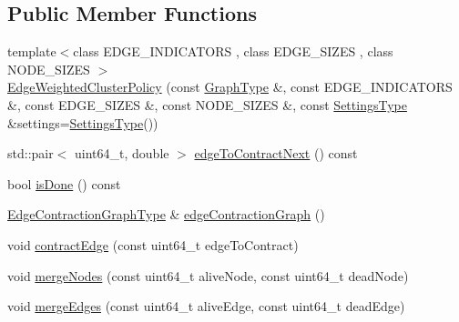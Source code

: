 \subsection*{Public Member Functions}
\begin{DoxyCompactItemize}
\item 
{\footnotesize template$<$class E\+D\+G\+E\+\_\+\+I\+N\+D\+I\+C\+A\+T\+O\+RS , class E\+D\+G\+E\+\_\+\+S\+I\+Z\+ES , class N\+O\+D\+E\+\_\+\+S\+I\+Z\+ES $>$ }\\\hyperlink{classnifty_1_1graph_1_1agglo_1_1EdgeWeightedClusterPolicy_a028e533bd1a4eca1b6fdebb70b50b899}{Edge\+Weighted\+Cluster\+Policy} (const \hyperlink{classnifty_1_1graph_1_1agglo_1_1EdgeWeightedClusterPolicy_a8e910f7b9d0c1baa1de7b6b1c3e58397}{Graph\+Type} \&, const E\+D\+G\+E\+\_\+\+I\+N\+D\+I\+C\+A\+T\+O\+RS \&, const E\+D\+G\+E\+\_\+\+S\+I\+Z\+ES \&, const N\+O\+D\+E\+\_\+\+S\+I\+Z\+ES \&, const \hyperlink{classnifty_1_1graph_1_1agglo_1_1EdgeWeightedClusterPolicy_a6c9e2acec086a9fcc4391f067a4ded46}{Settings\+Type} \&settings=\hyperlink{classnifty_1_1graph_1_1agglo_1_1EdgeWeightedClusterPolicy_a6c9e2acec086a9fcc4391f067a4ded46}{Settings\+Type}())
\item 
std\+::pair$<$ uint64\+\_\+t, double $>$ \hyperlink{classnifty_1_1graph_1_1agglo_1_1EdgeWeightedClusterPolicy_a5bfbc9880ddc3cbe5376635bbbd1312c}{edge\+To\+Contract\+Next} () const
\item 
bool \hyperlink{classnifty_1_1graph_1_1agglo_1_1EdgeWeightedClusterPolicy_a247a1cf5b19ad94f3eceee806989cc06}{is\+Done} () const
\item 
\hyperlink{classnifty_1_1graph_1_1agglo_1_1EdgeWeightedClusterPolicy_af2c3024ed1be514c58004dfa7e77448b}{Edge\+Contraction\+Graph\+Type} \& \hyperlink{classnifty_1_1graph_1_1agglo_1_1EdgeWeightedClusterPolicy_ac66821b0db08e136631b0c75adf660d0}{edge\+Contraction\+Graph} ()
\item 
void \hyperlink{classnifty_1_1graph_1_1agglo_1_1EdgeWeightedClusterPolicy_ab17fb3b1739432d2263366d2a3f0800c}{contract\+Edge} (const uint64\+\_\+t edge\+To\+Contract)
\item 
void \hyperlink{classnifty_1_1graph_1_1agglo_1_1EdgeWeightedClusterPolicy_ab6176f00d96818257fdffdb7a363c5e1}{merge\+Nodes} (const uint64\+\_\+t alive\+Node, const uint64\+\_\+t dead\+Node)
\item 
void \hyperlink{classnifty_1_1graph_1_1agglo_1_1EdgeWeightedClusterPolicy_ad6e93f21537c3931da24765c689de3c1}{merge\+Edges} (const uint64\+\_\+t alive\+Edge, const uint64\+\_\+t dead\+Edge)
\item 

\end{DoxyCompactItemize}
